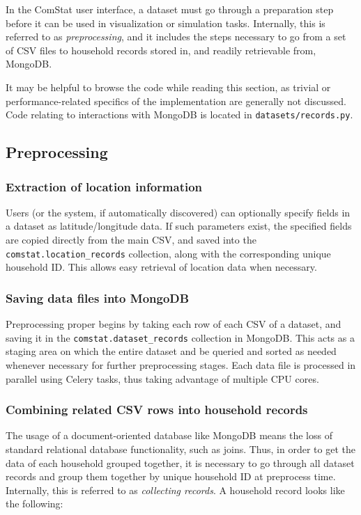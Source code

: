 In the ComStat user interface, a dataset must go through a preparation step before it can be used in visualization or simulation tasks. Internally, this is referred to as \emph{preprocessing}, and it includes the steps necessary to go from a set of CSV files to household records stored in, and readily retrievable from, MongoDB.

It may be helpful to browse the code while reading this section, as trivial or performance-related specifics of the implementation are generally not discussed. Code relating to interactions with MongoDB is located in \texttt{datasets/records.py}.


\subsection{Preprocessing}

\subsubsection{Extraction of location information}

Users (or the system, if automatically discovered) can optionally specify fields in a dataset as latitude/longitude data. If such parameters exist, the specified fields are copied directly from the main CSV, and saved into the \texttt{comstat.location\_records} collection, along with the corresponding unique household ID. This allows easy retrieval of location data when necessary.

\subsubsection{Saving data files into MongoDB}

Preprocessing proper begins by taking each row of each CSV of a dataset, and saving it in the \texttt{comstat.dataset\_records} collection in MongoDB. This acts as a staging area on which the entire dataset and be queried and sorted as needed whenever necessary for further preprocessing stages. Each data file is processed in parallel using Celery tasks, thus taking advantage of multiple CPU cores.

\subsubsection{Combining related CSV rows into household records}

The usage of a document-oriented database like MongoDB means the loss of standard relational database functionality, such as joins. Thus, in order to get the data of each household grouped together, it is necessary to go through all dataset records and group them together by unique household ID at preprocess time. Internally, this is referred to as \emph{collecting records}. A household record looks like the following:

